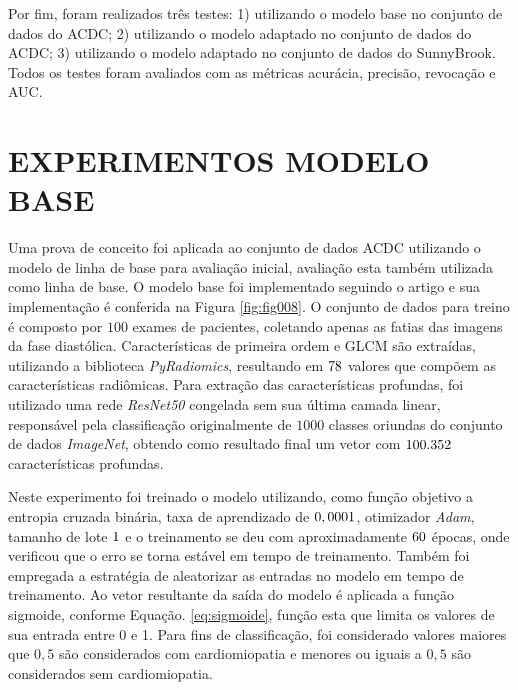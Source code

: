 Por fim, foram realizados três testes: 1) utilizando o modelo base no conjunto de dados do ACDC; 2) utilizando o modelo adaptado no conjunto de dados do ACDC; 3) utilizando o modelo adaptado no conjunto de dados do SunnyBrook. Todos os testes foram avaliados com as métricas acurácia, precisão, revocação e AUC.

\section{EXPERIMENTOS MODELO BASE}
\label{sec:cap5_experimentos_base}

Uma prova de conceito foi aplicada ao conjunto de dados \gls{ACDC} utilizando o modelo de linha de base para avaliação inicial, avaliação esta também utilizada como linha de base. O modelo base foi implementado seguindo o artigo e sua implementação é conferida na Figura \ref{fig:fig008}. O conjunto de dados para treino é composto por $100$ exames de pacientes, coletando apenas as fatias das imagens da fase diastólica. Características de primeira ordem e \gls{GLCM} são extraídas, utilizando a biblioteca \textit{PyRadiomics}, resultando em $78$ valores que compõem as características radiômicas. Para extração das características profundas, foi utilizado uma rede \textit{ResNet50} congelada sem sua última camada linear, responsável pela classificação originalmente de $1000$ classes oriundas do conjunto de dados \textit{ImageNet}, obtendo como resultado final um vetor com $100.352$ características profundas.


Neste experimento foi treinado o modelo utilizando, como função objetivo a entropia cruzada binária, taxa de aprendizado de $0,0001$, otimizador \textit{Adam}, tamanho de lote $1$ e o treinamento se deu com aproximadamente $60$ épocas, onde verificou que o erro se torna estável em tempo de treinamento. Também foi empregada a estratégia de aleatorizar as entradas no modelo em tempo de treinamento. Ao vetor resultante da saída do modelo é aplicada a função sigmoide, conforme Equação. \ref{eq:sigmoide}, função esta que limita os valores de sua entrada entre 0 e 1. Para fins de classificação, foi considerado valores maiores que $0,5$ são considerados com cardiomiopatia e menores ou iguais a $0,5$ são considerados sem cardiomiopatia.

